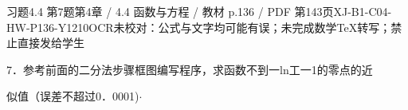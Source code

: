 \begin{bankitem}{习题4.4 第7题}{第4章 / 4.4 函数与方程 / 教材 p.136 / PDF 第143页}{XJ-B1-C04-HW-P136-Y1210}{OCR未校对：公式与文字均可能有误；未完成数学TeX转写；禁止直接发给学生}
\begin{ocrdraft}
\par
7．参考前面的二分法步骤框图编写程序，求函数不到一ln工一1的零点的近
\par
似值（误差不超过0．0001)\ensuremath{\cdot}
\end{ocrdraft}
\end{bankitem}
